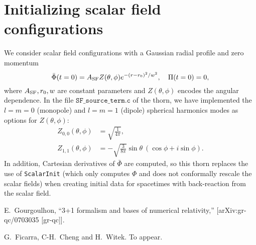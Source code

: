 \section{Initializing scalar field configurations}
We consider scalar field configurations with a Gaussian radial profile and zero momentum
\begin{equation}
    \bar{\Phi}(t=0) = A_{\rm SF} Z(\theta, \phi) e^{-(r-r_0)^2/w^2},
    \quad
    \Pi(t=0) = 0,
\end{equation}
where $A_{\rm SF}, r_0, w$ are constant parameters
and $Z(\theta, \phi)$ encodes the angular dependence.
In the file $\texttt{SF\_source\_term.c}$ of the thorn, we have implemented
the $l=m=0$ (monopole) and $l=m=1$ (dipole) spherical harmonics modes
as options for $Z(\theta, \phi)$:
\begin{align}
    Z_{0,0}(\theta, \phi)
    &= \sqrt{\frac{1}{4\pi}},
    \\
    Z_{1,1}(\theta, \phi)
    &= -\sqrt{\frac{3}{8\pi}} \sin\theta\ (\cos\phi + i \sin\phi).
\end{align}
In addition, Cartesian derivatives of $\bar{\Phi}$ are computed,
so this thorn replaces the use of \texttt{ScalarInit}
(which only computes $\Phi$ and does not conformally rescale the scalar fields)
when creating initial data for spacetimes with back-reaction from the scalar field.

\begin{thebibliography}{9}

E.~Gourgoulhon,
``3+1 formalism and bases of numerical relativity,''
[arXiv:gr-qc/0703035 [gr-qc]].

  G.~Ficarra, C-H.~Cheng and H.~Witek. To appear.


\end{thebibliography}



